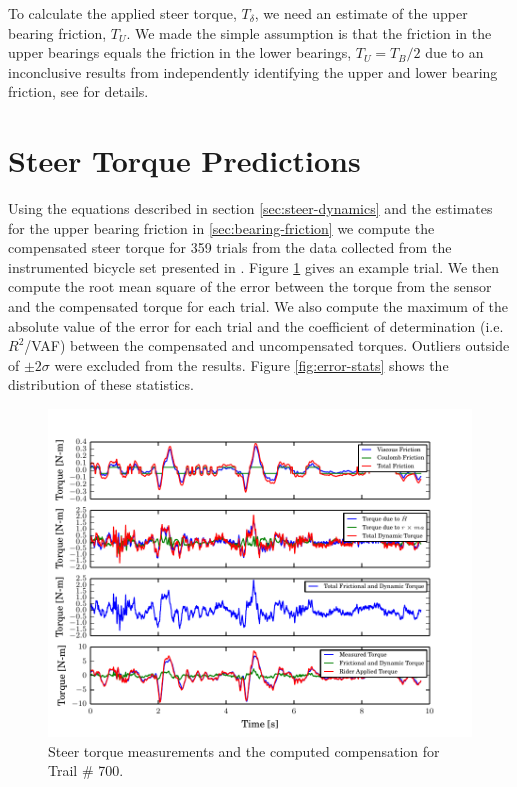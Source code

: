\documentclass[a4paper]{article}
\begin{document}
To calculate the applied steer torque, $T_\delta$, we need an estimate of the
upper bearing friction, $T_U$. We made the simple assumption is that the
friction in the upper bearings equals the friction in the lower bearings, $T_U
= T_B / 2$ due to an inconclusive results from independently identifying the
upper and lower bearing friction, see \cite{Moore2012} for details.

\section*{Steer Torque Predictions}

Using the equations described in section \ref{sec:steer-dynamics} and the
estimates for the upper bearing friction in \ref{sec:bearing-friction} we
compute the compensated steer torque for 359 trials from the data collected
from the instrumented bicycle set presented in \cite{Moore1012}. Figure
\ref{fig:steer-torque-components} gives an example trial. We then compute the
root mean square of the error between the torque from the sensor and the
compensated torque for each trial. We also compute the maximum of the absolute
value of the error for each trial and the coefficient of determination
(i.e. $R^2$/VAF) between the compensated and uncompensated torques. Outliers
outside of $\pm2 \sigma$ were excluded from the results. Figure
\ref{fig:error-stats} shows the distribution of these statistics.

\begin{figure}
  \includegraphics{figures/steer-torque-components.pdf}
  \caption{Steer torque measurements and the computed compensation for Trail \#
    700.}
  \label{fig:steer-torque-components}
\end{figure}
\end{document}

